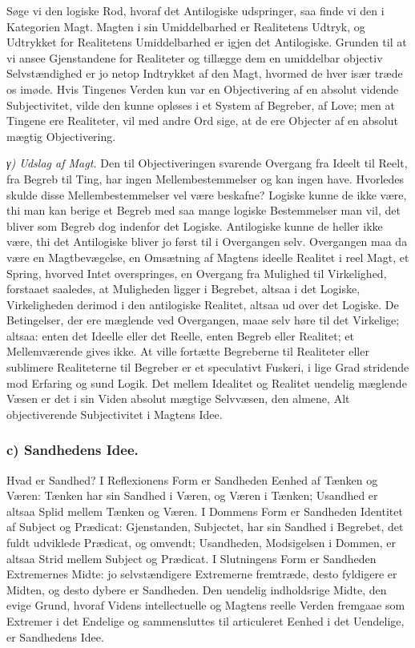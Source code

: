 \documentclass[12pt]{book}
\newcommand{\apage}[1]{\marginnote{\footnotesize\textit{[#1]}}}
\begin{document}
Søge vi den logiske Rod, hvoraf det Antilogiske udspringer, saa finde vi
den i Kategorien Magt. Magten i sin Umiddelbarhed er Realitetens Udtryk, og
Udtrykket for Realitetens Umiddelbarhed er igjen det Antilogiske. Grunden
til at vi ansee Gjenstandene for Realiteter og tillægge dem en umiddelbar
objectiv Selvstændighed er jo netop Indtrykket af den Magt, \apage{112} hvormed de hver
især træde os imøde. Hvis Tingenes Verden kun var en Objectivering af en
absolut vidende Subjectivitet, vilde den kunne opløses i et System af
Begreber, af Love; men at Tingene ere Realiteter, vil med andre Ord sige,
at de ere Objecter af en absolut mægtig Objectivering.

\emph{γ) Udslag af Magt.} Den til Objectiveringen svarende Overgang fra
Ideelt til Reelt, fra Begreb til Ting, har ingen Mellembestemmelser og kan
ingen have. Hvorledes skulde disse Mellembestemmelser vel være beskafne?
Logiske kunne de ikke være, thi man kan berige et Begreb med saa mange
logiske Bestemmelser man vil, det bliver som Begreb dog indenfor det
Logiske. Antilogiske kunne de heller ikke være, thi det Antilogiske bliver
jo først til i Overgangen selv. Overgangen maa da være en Magtbevægelse, en
Omsætning af Magtens ideelle Realitet i reel Magt, et Spring, hvorved Intet
overspringes, en Overgang fra Mulighed til Virkelighed, forstaaet saaledes,
at Muligheden ligger i Begrebet, altsaa i det Logiske, Virkeligheden
derimod i den antilogiske Realitet, altsaa ud over det Logiske. De
Betingelser, der ere mæglende ved Overgangen, maae selv høre til det
Virkelige; altsaa: enten det Ideelle eller det Reelle, enten Begreb eller
Realitet; et Mellemværende gives ikke. At ville fortætte Begreberne til
Realiteter eller sublimere Realiteterne til Begreber er et speculativt
Fuskeri, i lige Grad stridende mod Erfaring og sund Logik. Det mellem
Idealitet og Realitet uendelig mæglende Væsen \apage{113} er det i sin Viden absolut
mægtige Selvvæsen, den almene, Alt objectiverende Subjectivitet i Magtens
Idee.

\subsubsection*{c) Sandhedens Idee.} Hvad er Sandhed? I Reflexionens Form
er Sandheden Eenhed af Tænken og Væren: Tænken har sin Sandhed i Væren, og
Væren i Tænken; Usandhed er altsaa Splid mellem Tænken og Væren. I Dommens
Form er Sandheden Identitet af Subject og Prædicat: Gjenstanden, Subjectet,
har sin Sandhed i Begrebet, det fuldt udviklede Prædicat, og omvendt;
Usandheden, Modsigelsen i Dommen, er altsaa Strid mellem Subject og
Prædicat. I Slutningens Form er Sandheden Extremernes Midte: jo
selvstændigere Extremerne fremtræde, desto fyldigere er Midten, og desto
dybere er Sandheden. Den uendelig indholdsrige Midte, den evige Grund,
hvoraf Videns intellectuelle og Magtens reelle Verden fremgaae som
Extremer i det Endelige og sammensluttes til articuleret Eenhed i det
Uendelige, er Sandhedens Idee.
\end{document}
